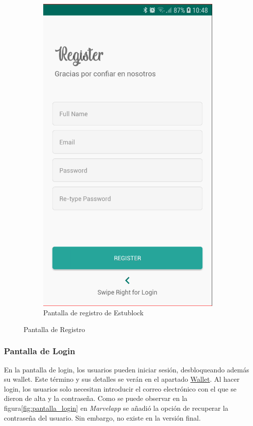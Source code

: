\begin{figure}[hbt]
\begin{subfigure}[b]{0.4\linewidth}
        \includegraphics[width=0.7\linewidth]{figs/Desarrollo/Interfaz/estublock_registro}
        \caption[Estublock Registro]{Pantalla de registro de Estublock}
	\end{subfigure} 
	\caption[Pantalla de Registro]{Pantalla de Registro}
	\label{fig:pantalla_registro}
\end{figure}

\subsubsection{Pantalla de Login}

En la pantalla de login, los usuarios pueden iniciar sesión, desbloqueando además su wallet. Este término y sus detalles se verán en el apartado \hyperref[sec:wallet]{Wallet}. Al hacer login, los usuarios solo necesitan introducir el correo electrónico con el que se dieron de alta y la contraseña. Como se puede observar en la figura\ref{fig:pantalla_login} en \emph{Marvelapp} se añadió la opción de recuperar la contraseña del usuario. Sin embargo, no existe en la versión final. \\

